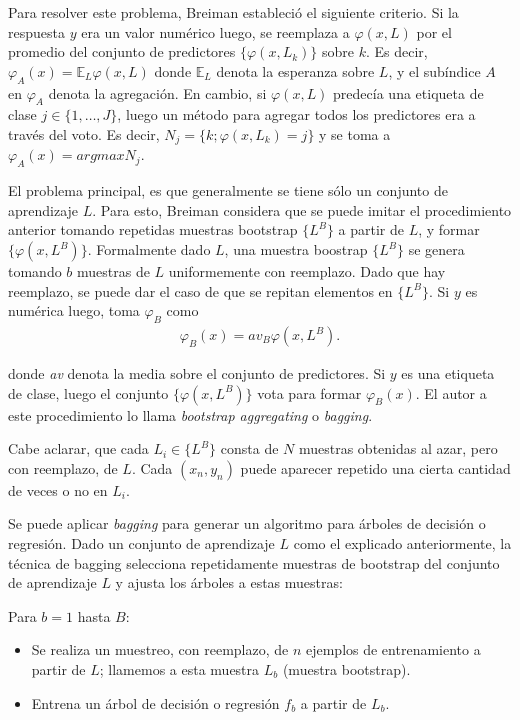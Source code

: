 	Para resolver este problema, Breiman estableció el siguiente criterio. Si la respuesta $y$ era un valor numérico luego, se reemplaza a $\varphi(x,L)$ por el promedio del conjunto de predictores $ \{ \varphi(x, L_k) \} $ sobre $k$. Es decir, $\varphi_A(x) = \mathbb{E}_L\varphi(x,L)$ donde $\mathbb{E}_L$ denota la esperanza sobre $L$, y el subíndice $A$ en $\varphi_A$ denota la agregación. En cambio, si $\varphi(x,L)$ predecía una etiqueta de clase $j \in \{ 1,\dots, J \} $, luego un método para agregar todos los predictores era a través del voto. Es decir, $N_j = \{ k;\varphi(x, L_k) = j \}$ y se toma a $\varphi_A(x) = argmax N_j$.

	El problema principal, es que generalmente se tiene sólo un conjunto de aprendizaje $L$. Para esto, Breiman considera que se puede imitar el procedimiento anterior tomando repetidas muestras bootstrap $\{ L^{B} \}$ a partir de $L$, y formar $\{ \varphi(x, L^{B}) \}$. Formalmente dado $L$, una muestra boostrap $\{ L^{B} \}$ se genera tomando $b$ muestras de $L$ uniformemente con reemplazo. Dado que hay reemplazo, se puede dar el caso de que se repitan elementos en $\{ L^{B} \}$. Si $y$ es numérica luego, toma $\varphi_B$ como
	\begin{align*}
		\varphi_B(x) = av_B\varphi(x,L^{B}).
	\end{align*}

	donde \textit{av} denota la media sobre el conjunto de predictores. Si $y$ es una etiqueta de clase, luego el conjunto  $\{ \varphi(x, L^{B}) \}$ vota para formar $\varphi_B(x)$. El autor a este procedimiento lo llama  \textit{bootstrap aggregating} o \textit{bagging}.

	Cabe aclarar, que cada $L_i \in \{ L^{B} \}$ consta de $N$ muestras obtenidas al azar, pero con reemplazo, de $L$. Cada $(x_n, y_n)$ puede aparecer repetido una cierta cantidad de veces o no en $L_i$.

	Se puede aplicar \textit{bagging} para generar un algoritmo para árboles de decisión o regresión. Dado un conjunto de aprendizaje $L$ como el explicado anteriormente, la técnica de bagging selecciona repetidamente muestras de bootstrap del conjunto de aprendizaje $L$ y ajusta los árboles a estas muestras:

	Para $b=1$ hasta $B$:
	\begin{itemize}
		\item Se realiza un muestreo, con reemplazo, de $n$ ejemplos de entrenamiento a partir de $L$; llamemos a esta muestra $L_b$ (muestra bootstrap).
		\item Entrena un árbol de decisión o regresión $f_b$ a partir de $L_b$.
	\end{itemize}

